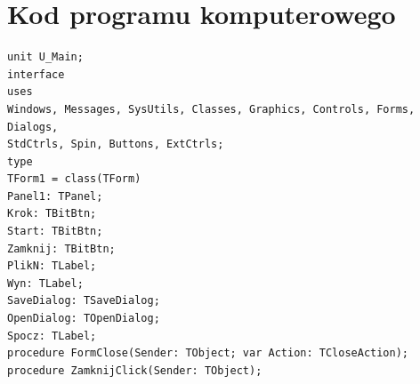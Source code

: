 \appendix
\chapter{Kod programu komputerowego}

\begin{lstlisting}
unit U_Main;
interface
uses
Windows, Messages, SysUtils, Classes, Graphics, Controls, Forms, Dialogs,
StdCtrls, Spin, Buttons, ExtCtrls;
type
TForm1 = class(TForm)
Panel1: TPanel;
Krok: TBitBtn;
Start: TBitBtn;
Zamknij: TBitBtn;
PlikN: TLabel;
Wyn: TLabel;
SaveDialog: TSaveDialog;
OpenDialog: TOpenDialog;
Spocz: TLabel;
procedure FormClose(Sender: TObject; var Action: TCloseAction);
procedure ZamknijClick(Sender: TObject);
\end{lstlisting}